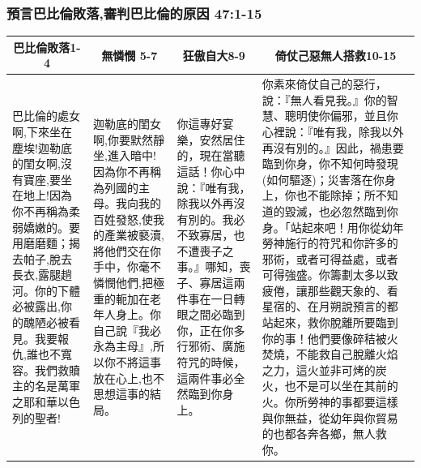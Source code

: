 \subsubsection{預言巴比倫敗落,審判巴比倫的原因 47:1-15}
\begin{table}[H]
\centering
\begin{tabular}{p{}|p{3.0cm}|p{3.0cm}|p{7.50cm}}\hline\hline
\multicolumn{1}{c|}{巴比倫敗落1-4}&\multicolumn{1}{c|}{無憐憫 5-7}&\multicolumn{1}{c|}{狂傲自大8-9}&\multicolumn{1}{c}{倚仗己惡無人搭救10-15}\\\hline
\multirow{1}{3.2cm}{巴比倫的處女啊,下來坐在塵埃!迦勒底的閨女啊,沒有寶座,要坐在地上!因為你不再稱為柔弱嬌嫩的。要用磨磨麵；揭去帕子,脫去長衣,露腿趟河。你的下體必被露出,你的醜陋必被看見。我要報仇,誰也不寬容。我們救贖主的名是萬軍之耶和華以色列的聖者!}
&迦勒底的閨女啊,你要默然靜坐,進入暗中!因為你不再稱為列國的主母。我向我的百姓發怒,使我的產業被褻瀆,將他們交在你手中，你毫不憐憫他們,把極重的軛加在老年人身上。你自己說『我必永為主母』,所以你不將這事放在心上,也不思想這事的結局。
&你這專好宴樂，安然居住的，現在當聽這話！你心中說：『唯有我，除我以外再沒有別的。我必不致寡居，也不遭喪子之事。』哪知，喪子、寡居這兩件事在一日轉眼之間必臨到你，正在你多行邪術、廣施符咒的時候，這兩件事必全然臨到你身上。
&你素來倚仗自己的惡行，說：『無人看見我。』你的智慧、聰明使你偏邪，並且你心裡說：『唯有我，除我以外再沒有別的。』因此，禍患要臨到你身，你不知何時發現(如何驅逐)；災害落在你身上，你也不能除掉；所不知道的毀滅，也必忽然臨到你身。「站起來吧！用你從幼年勞神施行的符咒和你許多的邪術，或者可得益處，或者可得強盛。你籌劃太多以致疲倦，讓那些觀天象的、看星宿的、在月朔說預言的都站起來，救你脫離所要臨到你的事！他們要像碎秸被火焚燒，不能救自己脫離火焰之力，這火並非可烤的炭火，也不是可以坐在其前的火。你所勞神的事都要這樣與你無益，從幼年與你貿易的也都各奔各鄉，無人救你。
\\\hline
\end{tabular}
\end{table}

